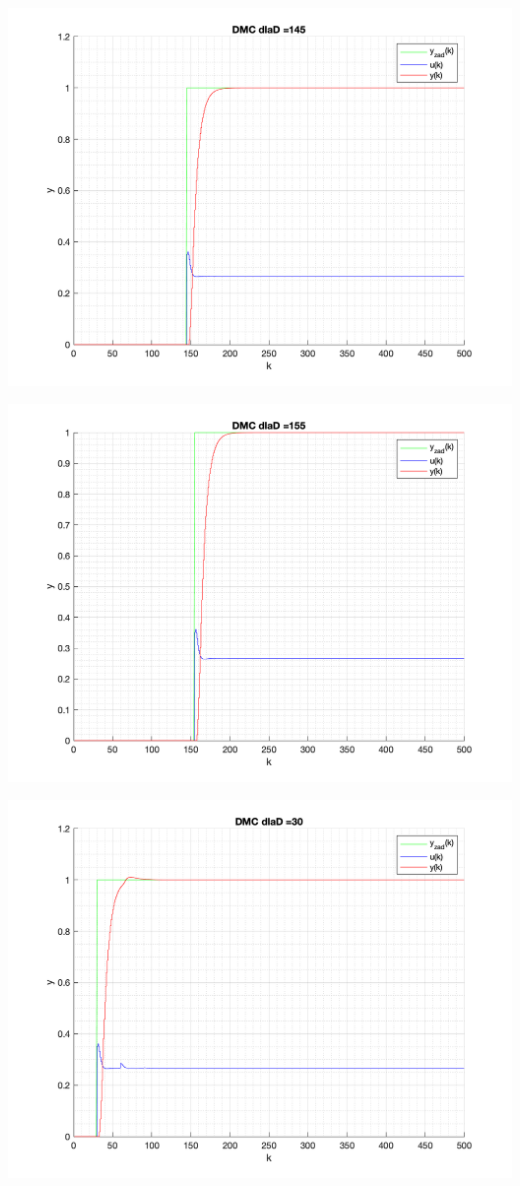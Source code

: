 \documentclass[a4paper, 11pt]{article}
\begin{document}
\begin{enumerate}
 \includegraphics[width=\linewidth]{./ModelsP4_D/P4_DMC_D_145_png.png} 
 
 \includegraphics[width=\linewidth]{./ModelsP4_D/P4_DMC_D_155_png.png} 
 
 \includegraphics[width=\linewidth]{./ModelsP4_D/P4_DMC_D_30_png.png} 
 

\end{enumerate}
\end{document}
